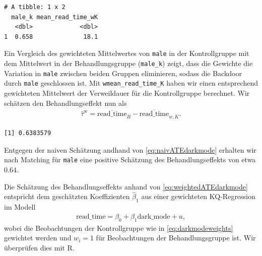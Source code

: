 \documentclass[
  a4paper,
  DIV=11,
  oneside]{scrreprt}
\newenvironment{Shaded}{\begin{snugshade}}{\end{snugshade}}
\newcommand{\FunctionTok}[1]{\textcolor[rgb]{0.28,0.35,0.67}{#1}}
\newcommand{\NormalTok}[1]{\textcolor[rgb]{0.00,0.23,0.31}{#1}}
\newcommand{\SpecialCharTok}[1]{\textcolor[rgb]{0.37,0.37,0.37}{#1}}
\begin{document}
\begin{verbatim}
# A tibble: 1 x 2
  male_k mean_read_time_wK
   <dbl>             <dbl>
1  0.658              18.1
\end{verbatim}

Ein Vergleich des gewichteten Mittelwertes von \texttt{male} in der
Kontrollgruppe mit dem Mittelwert in der Behandlungsgruppe
(\texttt{male\_k}) zeigt, dass die Gewichte die Variation in
\texttt{male} zwischen beiden Gruppen eliminieren, sodass die Backdoor
durch \texttt{male} geschlossen ist. Mit \texttt{wmean\_read\_time\_K}
haben wir einen entsprechend gewichteten Mittelwert der Verweildauer für
die Kontrollgruppe berechnet. Wir schätzen den Behandlungseffekt nun als
\begin{align}
  \widehat{\tau}^{\text{w}} = \overline{\text{read\_time}}_{B} - \overline{\text{read\_time}}_{w,K}.\label{eq:weightedATEdarkmode}
\end{align}

\begin{Shaded}
\end{Shaded}

\begin{verbatim}
[1] 0.6383579
\end{verbatim}

Entgegen der naiven Schätzung andhand von \eqref{eq:naivATEdarkmode}
erhalten wir nach Matching für \texttt{male} eine positive Schätzung des
Behandlungseffekts von etwa \(0.64\).

Die Schätzung des Behandlungseffekts anhand von
\eqref{eq:weightedATEdarkmode} entspricht dem geschätzten Koeffizienten
\(\widehat{\beta}_1\) aus einer gewichteten KQ-Regression im Modell
\begin{align*}
  \text{read\_time} = \beta_0 + \beta_1 \text{dark\_mode} + u,
\end{align*} wobei die Beobachtungen der Kontrollgruppe wie in
\eqref{eq:darkmodeweights} gewichtet werden und \(w_i=1\) für
Beobachtungen der Behandlungsgruppe ist. Wir überprüfen dies mit R.
\end{document}

